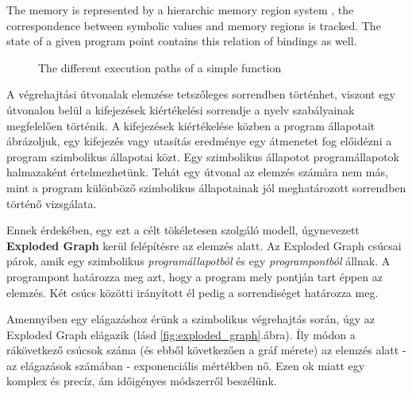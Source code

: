 \documentclass[oneside, a4paper, 12pt]{article}
\theoremstyle{definition}
\begin{document}
The memory is represented by a hierarchic memory region system 
\cite{clang:memmodel}, the correspondence between symbolic values and memory 
regions is tracked. The state of a given program point contains this relation 
of bindings as well.

\begin{figure}[h]
	\centering
	\caption{The different execution paths of a simple function}
	\label{fig:exec_path}
\end{figure}



A végrehajtási útvonalak elemzése tetszőleges sorrendben történhet,
viszont egy útvonalon belül a kifejezések kiértékelési sorrendje a nyelv
szabályainak megfelelően történik.
A kifejezések kiértékelése közben a program állapotait ábrázoljuk, egy kifejezés
vagy utasítás eredménye egy átmenetet fog előidézni a program szimbolikus
állapotai közt. Egy szimbolikus állapotot programállapotok halmazaként
értelmezhetünk. Tehát egy útvonal az elemzés számára nem más, mint a program
különböző szimbolikus állapotainak jól meghatározott sorrendben történő
vizsgálata.

Ennek érdekében, egy ezt a célt tökéletesen szolgáló modell, úgynevezett
\textbf{Exploded Graph} \cite{explodedgraph} kerül felépítésre az elemzés alatt.
Az Exploded Graph csúcsai párok, amik egy szimbolikus
\textit{programállapotból} és egy \textit{programpontból} állnak.
A programpont határozza meg azt, hogy a program mely pontján tart éppen az
elemzés. Két csúcs közötti irányított él pedig a sorrendiséget határozza meg.

Amennyiben egy elágazáshoz érünk a szimbolikus végrehajtás során, úgy az 
Exploded Graph elágazik (lásd
\ref{fig:exploded_graph}.ábra). Íly módon a rákövetkező csúcsok száma
(és ebből következően a gráf mérete) az elemzés alatt - az elágazások számában -
exponenciális mértékben nő.
Ezen ok miatt egy komplex és precíz, ám időigényes módszerről beszélünk.
\end{document}
